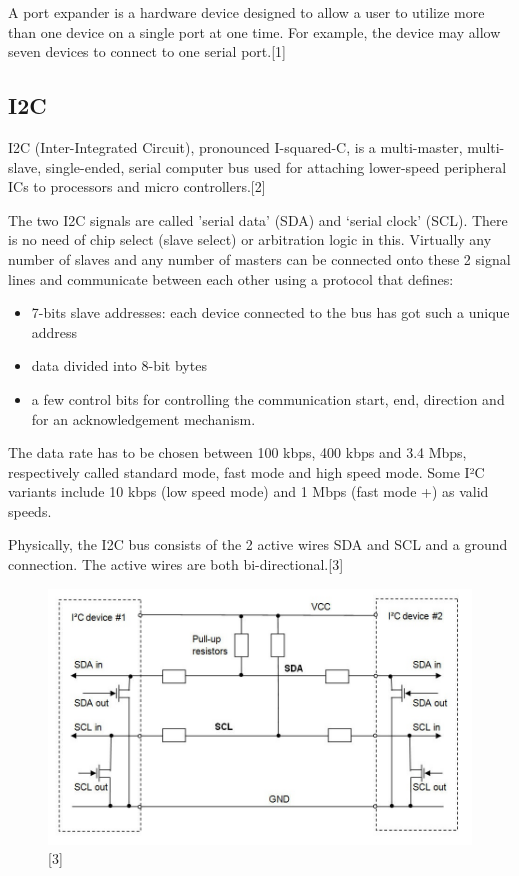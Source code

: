 \documentclass[11pt,a4paper]{article}
\begin{document}
	A port expander is a hardware device designed to allow a user to utilize more than one device on a single port at one time. For example, the device may allow seven devices to connect to one serial port.[1]
	
	\subsection{I2C}
	I2C (Inter-Integrated Circuit), pronounced I-squared-C, is a multi-master, multi-slave, single-ended, serial computer bus used for attaching lower-speed peripheral ICs to processors and micro controllers.[2]
	
	The two I2C signals are called 'serial data’ (SDA) and ‘serial clock’ (SCL). There is no need of chip select (slave select) or arbitration logic in this. Virtually any number of slaves and any number of masters can be connected onto these 2 signal lines and communicate between each other using a protocol that defines:
	\begin{itemize}
			\item 7-bits slave addresses: each device connected to the bus has got such a unique address
			\item data divided into 8-bit bytes
			\item a few control bits for controlling the communication start, end, direction and for an acknowledgement mechanism.
	\end{itemize}

	The data rate has to be chosen between 100 kbps, 400 kbps and 3.4 Mbps, respectively called standard mode, fast mode and high speed mode. Some I²C variants include 10 kbps (low speed mode) and 1 Mbps (fast mode +) as valid speeds.
	
	Physically, the I2C bus consists of the 2 active wires SDA and SCL and a ground connection. The active wires are both bi-directional.[3] 
	\begin{figure}[h!]
		\includegraphics[scale=0.4]{i2c.jpg}
		\centering
		\caption{[3]}
	\end{figure} 
	
\end{document}
